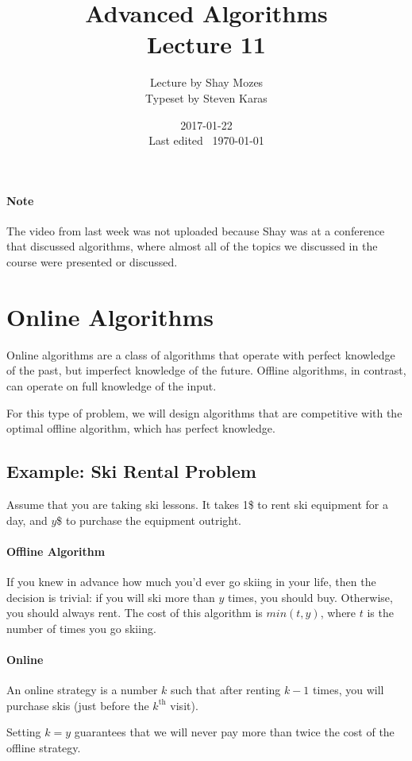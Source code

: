 \documentclass[a4paper]{article}
\title{Advanced Algorithms\\\large Lecture 11}
\date{2017-01-22 \\ Last edited \currenttime\ \today}
\author{Lecture by Shay Mozes\\Typeset by Steven Karas}
\begin{document}
\maketitle

\paragraph{Note}
The video from last week was not uploaded because Shay was at a conference that discussed algorithms, where almost all of the topics we discussed in the course were presented or discussed.

\section{Online Algorithms}
Online algorithms are a class of algorithms that operate with perfect knowledge of the past, but imperfect knowledge of the future. Offline algorithms, in contrast, can operate on full knowledge of the input.

For this type of problem, we will design algorithms that are competitive with the optimal offline algorithm, which has perfect knowledge.

\subsection{Example: Ski Rental Problem}
Assume that you are taking ski lessons. It takes 1\$ to rent ski equipment for a day, and $y$\$ to purchase the equipment outright.

\paragraph{Offline Algorithm}
If you knew in advance how much you'd ever go skiing in your life, then the decision is trivial: if you will ski more than $y$ times, you should buy. Otherwise, you should always rent.
The cost of this algorithm is $min(t,y)$, where $t$ is the number of times you go skiing.

\paragraph{Online}
An online strategy is a number $k$ such that after renting $k-1$ times, you will purchase skis (just before the $k^\text{th}$ visit).

Setting $k=y$ guarantees that we will never pay more than twice the cost of the offline strategy.
\end{document}
